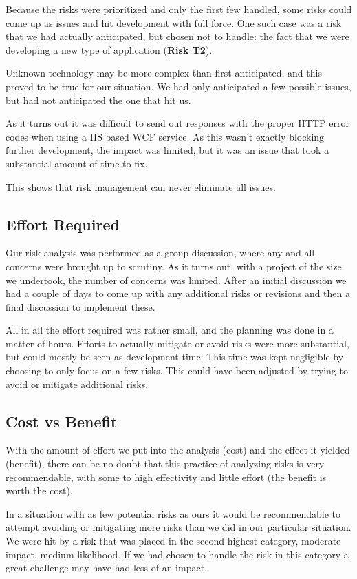 Because the risks were prioritized and only the first few handled, some risks could come up as issues and
hit development with full force. One such case was a risk that we had actually anticipated, but chosen
not to handle: the fact that we were developing a new type of application (\textbf{Risk T2}).

Unknown technology may be more complex than first anticipated, and this proved to be true for our situation.
We had only anticipated a few possible issues, but had not anticipated the one that hit us.

As it turns out it was difficult to send out responses with the proper HTTP error codes when using a IIS based
WCF service. As this wasn't exactly blocking further development, the impact was limited, but it was an issue
that took a substantial amount of time to fix.

This shows that risk management can never eliminate all issues.

\subsection{Effort Required}

Our risk analysis was performed as a group discussion, where any and all concerns were brought up to scrutiny.
As it turns out, with a project of the size we undertook, the number of concerns was limited. After an initial
discussion we had a couple of days to come up with any additional risks or revisions and then a final discussion
to implement these.

All in all the effort required was rather small, and the planning was done in a matter of hours. Efforts to actually
mitigate or avoid risks were more substantial, but could mostly be seen as development time. This time was kept
negligible by choosing to only focus on a few risks. This could have been adjusted by trying to avoid or mitigate
additional risks.

\subsection{Cost vs Benefit}

With the amount of effort we put into the analysis (cost) and the effect it yielded (benefit), there can be no doubt
that this practice of analyzing risks is very recommendable, with some to high effectivity and little effort (the
benefit is worth the cost).

In a situation with as few potential risks as ours it would be recommendable to attempt avoiding or mitigating more
risks than we did in our particular situation. We were hit by a risk that was placed in the second-highest category,
moderate impact, medium likelihood. If we had chosen to handle the risk in this category a great challenge may have
had less of an impact.